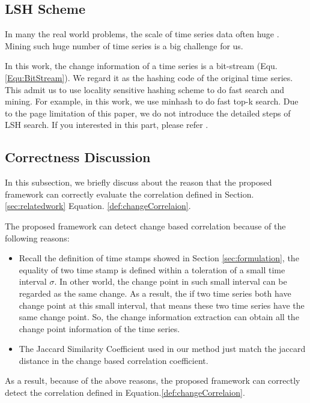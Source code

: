 \subsection{LSH Scheme}

In many the real world problems, the scale of time series data often huge \cite{rakthanmanon2012searching}. Mining such huge number of time series is a big challenge for us.

In this work, the change information of a time series is a bit-stream (Equ. \ref{Equ:BitStream}). 
We regard it as the hashing code of the original time series. 
This admit us to use locality sensitive hashing scheme to do fast search and mining.
For example, in this work, we use minhash to do fast top-k search. Due to the page limitation of this paper, we do not introduce the detailed steps of LSH search. If you interested in this part, please refer \cite{shrivastava2014asymmetric,indyk1998approximate}.

\subsection{Correctness Discussion}

In this subsection, we briefly discuss about the reason that the proposed framework can correctly evaluate the correlation defined in Section.\ref{sec:relatedwork} Equation. \ref{def:changeCorrelaion}.

The proposed framework can detect change based correlation because of the following reasons:

\begin{itemize}
  \item Recall the definition of time stamps showed in Section \ref{sec:formulation}, the equality of two time stamp is defined within a toleration of a small time interval $\sigma$. In other world, the change point in such small interval can be regarded as the same change. 
  As a result, the if two time series both have change point at this small interval, that means  these two time series have the same change point.
  So, the change information extraction can obtain all the change point information of the time series.
  \item The Jaccard Similarity Coefficient used in our method just match the jaccard distance in the change based correlation coefficient.
\end{itemize}

As a result, because of the above reasons, the proposed framework can correctly detect the correlation defined in Equation.\ref{def:changeCorrelaion}.
